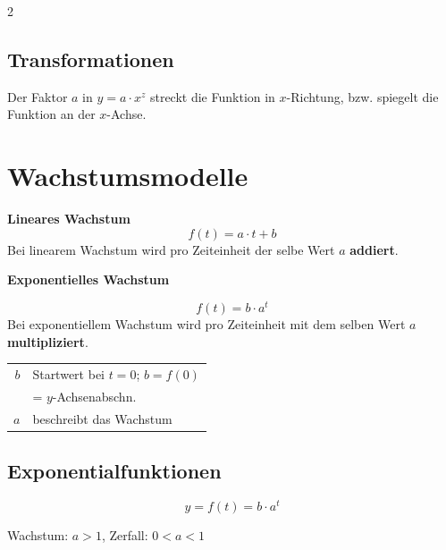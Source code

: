

\newpage

\begin{multicols}2

  \subsection*{Transformationen}
  Der Faktor $a$ in $y=a\cdot{}x^z$ streckt die Funktion in $x$-Richtung, bzw. spiegelt die Funktion an der $x$-Achse.

  \hrulefill
  
\section*{Wachstumsmodelle}

\textbf{Lineares Wachstum}
$$f(t) = a\cdot t + b$$
Bei linearem Wachstum wird pro Zeiteinheit der selbe Wert $a$ \textbf{addiert}.

\textbf{Exponentielles Wachstum}

$$f(t) = b\cdot{}a^t$$
Bei exponentiellem Wachstum wird pro Zeiteinheit mit dem selben Wert $a$ \textbf{multipliziert}.

  \begin{tabular}{rl}
   $b$  & Startwert bei $t=0$; $b=f(0)$\\
        & \phantom{$b$} = $y$-Achsenabschn.\\
   $a$  & beschreibt das Wachstum
  \end{tabular}


  \subsection*{Exponentialfunktionen}
\begin{tcolorbox}[colback=white]$$y=f(t) = b\cdot{}a^t$$\end{tcolorbox}
Wachstum: $a>1$, Zerfall: $0<a<1$



\end{multicols}
